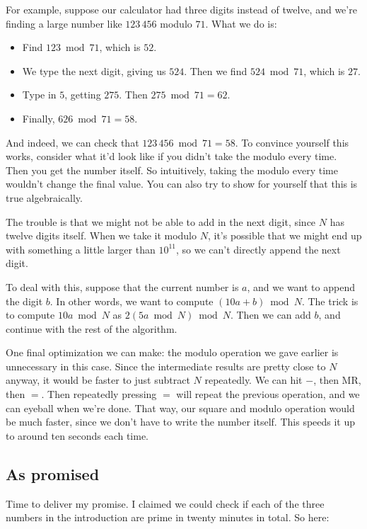 \documentclass[11pt,paper=letter]{scrartcl}
\begin{document}
For example, suppose our calculator had three digits instead of twelve, and we're finding a large number like $123\,456$ modulo $71$. What we do is:
\begin{itemize}[itemsep=-0.5ex]
  \item Find $123 \bmod 71$, which is $52$.
  \item We type the next digit, giving us $524$. Then we find $524 \bmod 71$, which is $27$.
  \item Type in $5$, getting $275$. Then $275 \bmod 71 = 62$.
  \item Finally, $626 \bmod 71 = 58$.
\end{itemize}
And indeed, we can check that $123\,456 \bmod 71 = 58$. To convince yourself this works, consider what it'd look like if you didn't take the modulo every time. Then you get the number itself. So intuitively, taking the modulo every time wouldn't change the final value. You can also try to show for yourself that this is true algebraically.

The trouble is that we might not be able to add in the next digit, since $N$ has twelve digits itself. When we take it modulo $N$, it's possible that we might end up with something a little larger than $10^{11}$, so we can't directly append the next digit.

To deal with this, suppose that the current number is $a$, and we want to append the digit $b$. In other words, we want to compute $(10a + b) \bmod N$. The trick is to compute $10a \bmod N$ as $2(5a \bmod N) \bmod N$. Then we can add $b$, and continue with the rest of the algorithm.

One final optimization we can make: the modulo operation we gave earlier is unnecessary in this case. Since the intermediate results are pretty close to $N$ anyway, it would be faster to just subtract $N$ repeatedly. We can hit $-$, then MR, then $=$. Then repeatedly pressing $=$ will repeat the previous operation, and we can eyeball when we're done. That way, our square and modulo operation would be much faster, since we don't have to write the number itself. This speeds it up to around ten seconds each time.

\subsection{As promised}

Time to deliver my promise. I claimed we could check if each of the three numbers in the introduction are prime in twenty minutes in total. So here:
\end{document}
